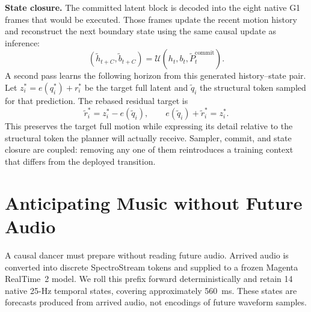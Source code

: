 \documentclass[conference]{IEEEtran}
\newif\ifshowpapertodos
\newcommand{\papertodo}[1]{%
\ifshowpapertodos
\par\smallskip\noindent
{\color{red!75!black}\textbf{TODO:} #1}
\smallskip\par
\fi}
\begin{document}
\textbf{State closure.} The committed latent block is decoded into the eight native G1 frames that would be executed. Those frames update the recent motion history and reconstruct the next boundary state using the same causal update as inference:
\begin{equation}
    (\tilde{h}_{t+C},\tilde{b}_{t+C})
    =\mathcal{U}(h_t,b_t,\tilde{P}_t^{\mathrm{commit}}).
    \label{eq:generated_context}
\end{equation}
A second pass learns the following horizon from this generated history--state pair. Let $z_i^*=e(q_i^*)+r_i^*$ be the target full latent and $\tilde q_i$ the structural token sampled for that prediction. The rebased residual target is
\begin{equation}
    \tilde r_i^*=z_i^*-e(\tilde q_i),
    \qquad e(\tilde q_i)+\tilde r_i^*=z_i^*.
    \label{eq:residual_rebasing}
\end{equation}
This preserves the target full motion while expressing its detail relative to the structural token the planner will actually receive. Sampler, commit, and state closure are coupled: removing any one of them reintroduces a training context that differs from the deployed transition.

\papertodo{Compare the final d16 method with matched Teacher Forcing on the complete
preregistered held-out manifest of 60-s free-running rollouts. Use one frozen G1-FK
mapping, one feature extractor, and identical source tracks, sampling seeds, and
durations for all methods. Report track-level point estimates and paired 95\%
confidence intervals over all eligible tracks; use non-overlapping 20-s windows only
for long-horizon degradation analysis. Retrain each Commit-Forcing removal under the
same parent, data, budget, and seeds. Do not select tracks or metrics according to the
observed test margin, and keep project-specific transition diagnostics outside the
headline table.}

\section{Anticipating Music without Future Audio}
A causal dancer must prepare without reading future audio. Arrived audio is converted into discrete SpectroStream tokens and supplied to a frozen Magenta RealTime~2 model. We roll this prefix forward deterministically and retain 14 native 25-Hz temporal states, covering approximately 560~ms. These states are forecasts produced from arrived audio, not encodings of future waveform samples.
\end{document}
